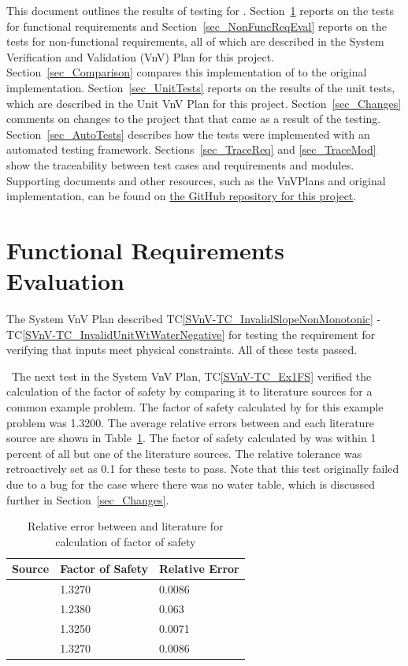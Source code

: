 \documentclass[12pt, titlepage]{article}
\newcommand{\tcref}[1]{TC\ref{#1}}
\begin{document}
This document outlines the results of testing for \progname{}. 
Section~\ref{sec_FuncReqEval} reports on the tests for functional requirements 
and Section~\ref{sec_NonFuncReqEval} reports on the tests for non-functional 
requirements, all of which are described in the System Verification and 
Validation (VnV) Plan for this project. Section~\ref{sec_Comparison} compares 
this implementation of \progname to the original implementation. 
Section~\ref{sec_UnitTests} reports on the results of the unit tests, which are 
described in the Unit VnV Plan for this project. Section~\ref{sec_Changes} 
comments on changes to the project that that came as a result of the testing. 
Section~\ref{sec_AutoTests} describes how the tests were implemented with an 
automated testing framework. Sections~\ref{sec_TraceReq} and \ref{sec_TraceMod} 
show the traceability between test cases and requirements and modules. 
Supporting documents and other resources, such as the VnVPlans and original 
implementation, can be found on 
\href{https://github.com/smiths/caseStudies/tree/master/CaseStudies/ssp}{the 
GitHub repository for this project}.

\section{Functional Requirements Evaluation} \label{sec_FuncReqEval}

The System VnV Plan described \tcref{SVnV-TC_InvalidSlopeNonMonotonic} - 
\tcref{SVnV-TC_InvalidUnitWtWaterNegative} for testing the requirement for 
verifying that inputs meet physical constraints. All of these tests passed. 

~\newline \noindent The next test in the System VnV Plan, \tcref{SVnV-TC_Ex1FS} 
verified 
the calculation of the factor of safety by comparing it to literature sources 
for a common example problem. The factor of safety calculated by \progname for 
this example problem was 1.3200. The average relative errors between \progname 
and each literature source are shown in Table~\ref{Table:LitFS}. The factor of 
safety calculated by \progname was within 1 percent of all but one of the 
literature sources. The relative tolerance was retroactively set as 0.1 for 
these tests to pass. Note that this test originally failed due to a bug for the 
case where there was no water table, which is discussed further in 
Section~\ref{sec_Changes}.

\begin{table}[!h]
\begin{tabularx}{1.0\textwidth}{p{7cm} l l}
	\toprule \textbf{Source} & \textbf{Factor of Safety} & \textbf{Relative 
	Error}\\ \midrule
	\cite{Greco1996} & 1.3270 & 0.0086\\
	\cite{MalkawiEtAl} & 1.2380 & 0.063\\
	\cite{ChengEtAl} & 1.3250 & 0.0071\\
	\cite{LiEtAl} & 1.3270 & 0.0086\\
	\bottomrule
\end{tabularx}
\caption{Relative error between \progname and literature for calculation of 
factor of safety}
\label{Table:LitFS}
\end{table}
\end{document}
